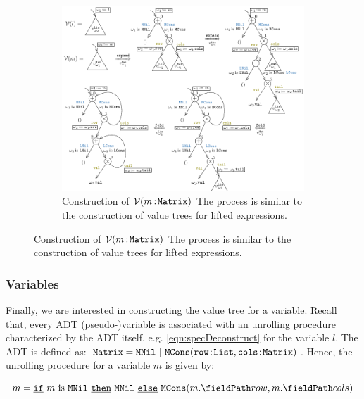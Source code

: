 \begin{figure}[H]
\begin{subfigure}[b]{\textwidth}
\begin{center}
\includegraphics[scale=1.3]{chapters/figures/figValueTreeConvVar.pdf}
\end{center}
\caption{\label{fig:valuetreeconvvar} Construction of $\mathcal{V}(m{{\,\tt :\!Matrix}})$
The process is similar to the construction of value trees for lifted expressions.}
\end{subfigure}
\end{figure}

\subsubsection{Variables}
Finally, we are interested in constructing the value tree for a variable.
Recall that, every ADT (pseudo-)variable is associated with an unrolling procedure
characterized by the ADT itself. e.g. \cref{eqn:specDeconstruct}
for the  variable $l$.
The  ADT is defined as:
${\tt Matrix} = {\tt MNil} \ | \ {\tt MCons}({{\tt row}} \!:\! {\tt List}, {{\tt cols}} \!:\! {\tt Matrix})$.
Hence, the unrolling procedure for a  variable $m$ is given by:

\begin{equation}
\label{matrixunrollingprocedure}
m = \sumIf{\sumIs{m}{MNil}} \  \sumThen{\cons{MNil}} \  \sumElse{\cons{MCons}(\prodAccess{m}{row}, \prodAccess{m}{cols})}
\end{equation}

